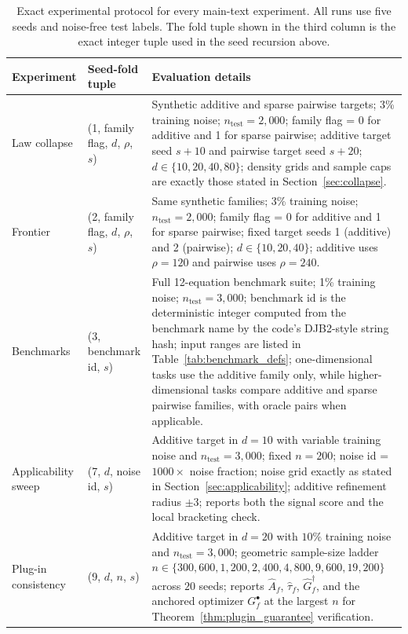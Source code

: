 \documentclass{article}
\begin{document}
\begin{table}[h]
\caption{Exact experimental protocol for every main-text experiment. All runs use five seeds and noise-free test labels. The fold tuple shown in the third column is the exact integer tuple used in the seed recursion above.}
\label{tab:exp_protocol}
\centering
\footnotesize
\setlength{\tabcolsep}{4pt}
\renewcommand{\arraystretch}{1.08}
\begin{tabularx}{\textwidth}{@{}>{\raggedright\arraybackslash}p{}>{\raggedright\arraybackslash}p{}X@{}}
\toprule
Experiment & Seed-fold tuple & Evaluation details \\
\midrule
Law collapse & (1, family flag, $d$, $\rho$, $s$) & Synthetic additive and sparse pairwise targets; 3\% training noise; $n_{\text{test}}=2{,}000$; family flag = 0 for additive and 1 for sparse pairwise; additive target seed $s+10$ and pairwise target seed $s+20$; $d\in\{10,20,40,80\}$; density grids and sample caps are exactly those stated in Section~\ref{sec:collapse}. \\
Frontier & (2, family flag, $d$, $\rho$, $s$) & Same synthetic families; 3\% training noise; $n_{\text{test}}=2{,}000$; family flag = 0 for additive and 1 for sparse pairwise; fixed target seeds 1 (additive) and 2 (pairwise); $d\in\{10,20,40\}$; additive uses $\rho=120$ and pairwise uses $\rho=240$. \\
Benchmarks & (3, benchmark id, $s$) & Full 12-equation benchmark suite; 1\% training noise; $n_{\text{test}}=3{,}000$; benchmark id is the deterministic integer computed from the benchmark name by the code's DJB2-style string hash; input ranges are listed in Table~\ref{tab:benchmark_defs}; one-dimensional tasks use the additive family only, while higher-dimensional tasks compare additive and sparse pairwise families, with oracle pairs when applicable. \\
Applicability sweep & (7, $d$, noise id, $s$) & Additive target in $d=10$ with variable training noise and $n_{\text{test}}=3{,}000$; fixed $n=200$; noise id = $1000\times$ noise fraction; noise grid exactly as stated in Section~\ref{sec:applicability}; additive refinement radius $\pm 3$; reports both the signal score and the local bracketing check. \\
Plug-in consistency & (9, $d$, $n$, $s$) & Additive target in $d=20$ with $10\%$ training noise and $n_{\text{test}}=3{,}000$; geometric sample-size ladder $n \in \{300, 600, 1{,}200, 2{,}400, 4{,}800, 9{,}600, 19{,}200\}$ across $20$ seeds; reports $\widehat{A}_f$, $\widehat{\tau}_f$, $\widehat{G}_f^\dagger$, and the anchored optimizer $G_f^\bullet$ at the largest $n$ for Theorem~\ref{thm:plugin_guarantee} verification. \\
\bottomrule
\end{tabularx}
\end{table}
\normalsize
\renewcommand{\arraystretch}{1.0}
\setlength{\tabcolsep}{6pt}
\end{document}
